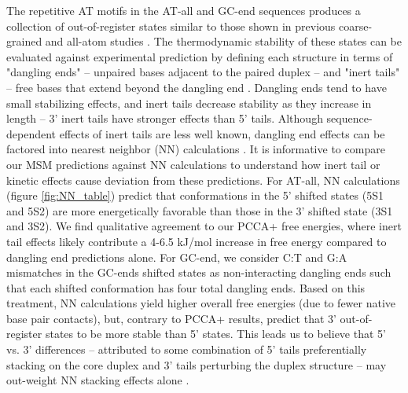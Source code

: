 \documentclass[journal=jpcbfk,manuscript=article]{achemso}
\begin{document}
The repetitive AT motifs in the AT-all and GC-end sequences produces a collection of out-of-register states similar to those shown in previous coarse-grained and all-atom studies \citep{Phys2014,  Romano2013DNADependence, Araque2016LatticeCooperativity, Xiao2019}. The thermodynamic stability of these states can be evaluated against experimental prediction by defining each structure in terms of "dangling ends" -- unpaired bases adjacent to the paired duplex -- and "inert tails" -- free bases that extend beyond the dangling end \citep{Michele2014EHybridization}. Dangling ends tend to have small stabilizing effects, and inert tails decrease stability as they increase in length -- 3' inert tails have stronger effects than 5' tails. Although sequence-dependent effects of inert tails are less well known, dangling end effects can be factored into nearest neighbor (NN) calculations \citep{Santalucia2004TM}. It is informative to compare our MSM predictions against NN calculations to understand how inert tail or kinetic effects cause deviation from these predictions. For AT-all, NN calculations (figure \ref{fig:NN_table}) predict that conformations in the 5' shifted states (5S1 and 5S2) are more energetically favorable than those in the 3' shifted state (3S1 and 3S2). We find qualitative agreement to our PCCA+ free energies, where inert tail effects likely contribute a 4-6.5 kJ/mol increase in free energy compared to dangling end predictions alone. For GC-end, we consider C:T and G:A mismatches in the GC-ends shifted states as non-interacting dangling ends such that each shifted conformation has four total dangling ends. Based on this treatment, NN calculations yield higher overall free energies (due to fewer native base pair contacts), but, contrary to PCCA+ results, predict that 3' out-of-register states to be more stable than 5' states. This leads us to believe that 5' vs. 3' differences -- attributed to some combination of 5' tails preferentially stacking on the core duplex and 3' tails perturbing the duplex structure -- may out-weight NN stacking effects alone \citep{Doktycz1990ThermodynamicATGC}. 

\end{document}
